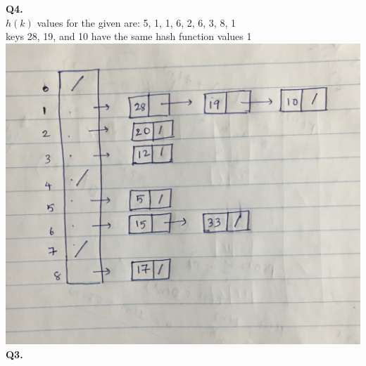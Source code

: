 \documentclass[11pt]{article}
\begin{document}
\hline
\vspace{5mm}
\textbf{Q4.}\\
$h(k)$ values for the given are: 5, 1, 1, 6, 2, 6, 3, 8, 1\\
keys 28, 19, and 10 have the same hash function values 1\\
\includegraphics[scale=0.2]{46EE4810-5365-483C-8FC9-DEC8FEAB8562.jpeg}
\vspace{5mm}
\hline
\vspace{5mm}
\textbf{Q3.}\\
\end{document}
